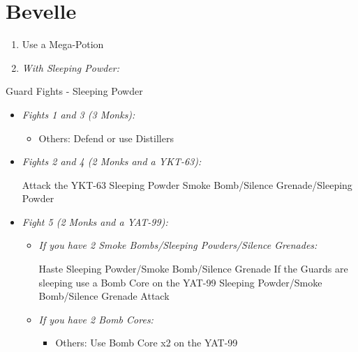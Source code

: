 \chapter{Bevelle}
\begin{enumerate}
	\item Use a Mega-Potion
	\item \textit{With Sleeping Powder:}
\end{enumerate}
\begin{battle}{Guard Fights - Sleeping Powder}
	\begin{itemize}
		\item \textit{Fights 1 and 3 (3 Monks):}
			\begin{itemize}
				\tidusf Attack
				\item Others: Defend or use Distillers
			\end{itemize}
		\item \textit{Fights 2 and 4 (2 Monks and a YKT-63):}
			\begin{itemize}
				\tidusf Attack the YKT-63
				\rikkuf Sleeping Powder
				\kimahrif Smoke Bomb/Silence Grenade/Sleeping Powder
			\end{itemize}
		\item \textit{Fight 5 (2 Monks and a YAT-99):}
			\begin{itemize}
				\item \textit{If you have 2 Smoke Bombs/Sleeping Powders/Silence Grenades:}
					\begin{itemize}
						\tidusf Haste \rikku
						\rikkuf Sleeping Powder/Smoke Bomb/Silence Grenade
						\rikkuf If the Guards are sleeping use a Bomb Core on the YAT-99
						\rikkuf Sleeping Powder/Smoke Bomb/Silence Grenade
						\tidusf Attack
					\end{itemize}
				\item \textit{If you have 2 Bomb Cores:}
					\begin{itemize}
						\tidusf Attack the Monks
						\item Others: Use Bomb Core x2 on the YAT-99
					\end{itemize}
			\end{itemize}
	\end{itemize}
\end{battle}
